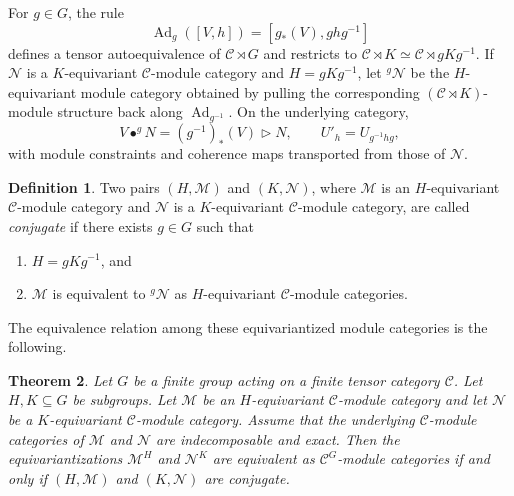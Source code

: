 \documentclass[12pt]{amsart}
\theoremstyle{plain}
\newtheorem{theorem}{Theorem}[section]
\theoremstyle{definition} %
\newtheorem{definition}[theorem]{Definition}
\theoremstyle{remark} %
\newcommand{\cC}{\mathcal{C}}
\newcommand{\cM}{\mathcal{M}}
\newcommand{\cN}{\mathcal{N}}
\newcommand{\Ad}{\operatorname{Ad}}
\begin{document}
For $g\in G$, the rule
\[
\Ad_g([V,h])=[g_*(V),ghg^{-1}]
\]
defines a tensor autoequivalence of $\cC\rtimes G$ and restricts to
$\cC\rtimes K\simeq\cC\rtimes gKg^{-1}$. If $\cN$ is a $K$-equivariant
$\cC$-module category and $H=gKg^{-1}$, let ${}^g\cN$ be the
$H$-equivariant module category obtained by pulling the corresponding
$(\cC\rtimes K)$-module structure back along $\Ad_{g^{-1}}$. On the
underlying category,
\[
V\bullet^g N=(g^{-1})_*(V)\triangleright N,
\qquad
U'_h=U_{g^{-1}hg},
\]
with module constraints and coherence maps transported from those of $\cN$.

\begin{definition}\label{def:conjugate_equivariant_module_categories}
Two pairs $(H,\cM)$ and $(K,\cN)$, where $\cM$ is an $H$-equivariant $\cC$-module category and $\cN$ is a $K$-equivariant $\cC$-module category, are called \emph{conjugate} if there exists $g \in G$ such that
\begin{enumerate}
\item $H = gKg^{-1}$, and
\item $\cM$ is equivalent to ${}^g\cN$ as $H$-equivariant $\cC$-module categories.
\end{enumerate}
\end{definition}

The equivalence relation among these equivariantized module categories is the following.

\begin{theorem}\label{thm:conjugacy_equivariantization}
Let $G$ be a finite group acting on a finite tensor category $\cC$. Let $H,K \subseteq G$ be subgroups. Let $\cM$ be an $H$-equivariant $\cC$-module category and let $\cN$ be a $K$-equivariant $\cC$-module category. Assume that the underlying $\cC$-module categories of $\cM$ and $\cN$ are indecomposable and exact. Then the equivariantizations $\cM^H$ and $\cN^K$ are equivalent as $\cC^G$-module categories if and only if $(H,\cM)$ and $(K,\cN)$ are conjugate.
\end{theorem}
\end{document}
